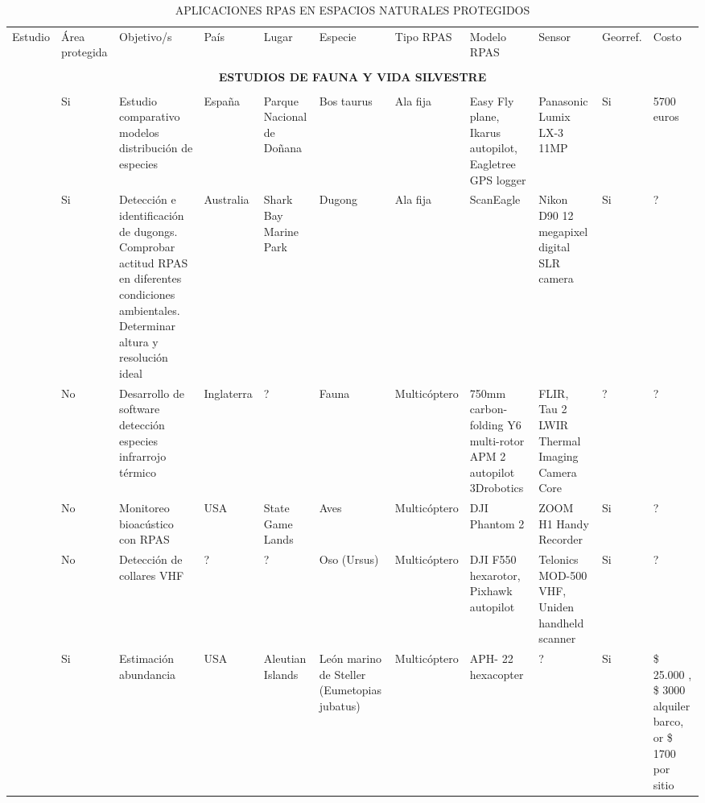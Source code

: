 \documentclass[onecolumn]{extarticle}
\begin{document}
\begin{landscape}
\begin{table}

\caption{APLICACIONES RPAS EN ESPACIOS NATURALES PROTEGIDOS}
\tiny
\begin{tabular}{p{3cm}p{1.2cm}p{3cm}p{1cm}p{2cm}p{2cm}p{1cm}p{2cm}p{2cm}p{1cm}p{2cm}}

\cmidrule(r){1-11}

Estudio & Área protegida & Objetivo/s & País & Lugar & Especie & Tipo RPAS & Modelo RPAS & Sensor & Georref. & Costo \\ \cmidrule(r){1-11}

\multicolumn{11}{c}{} \\
\multicolumn{11}{c}{ {\bf ESTUDIOS DE FAUNA Y VIDA SILVESTRE}  } \\
\multicolumn{11}{c}{} \\

\cite{PazmanyMulero2015}  & Si & Estudio comparativo modelos distribución de especies & España & Parque Nacional de Doñana & Bos taurus  & Ala fija & Easy Fly plane, Ikarus autopilot, Eagletree GPS logger & Panasonic Lumix LX-3 11MP & Si & 
5700 euros \\ 

\citealt{Hodgson2013} & Si & Detección e identificación de dugongs.  Comprobar actitud  RPAS en diferentes condiciones ambientales. Determinar altura y resolución ideal  & Australia & Shark Bay Marine Park & Dugong & Ala fija &  ScanEagle & Nikon D90 12 megapixel digital SLR camera  & Si & ?  \\ 

\cite{Longmore2017} & No & Desarrollo de software detección especies infrarrojo térmico & Inglaterra & ? & Fauna & Multicóptero & 750mm carbon-folding Y6 multi-rotor APM 2 autopilot 3Drobotics & FLIR, Tau 2 LWIR Thermal Imaging Camera Core  & ? & ?  \\ 

\cite{Wilson2017}  & No & Monitoreo bioacústico con RPAS & USA & State Game Lands & Aves  & Multicóptero & DJI Phantom 2 & ZOOM H1 Handy Recorder  & Si & ? \\ 

\cite{Bayram2016}  &  No & Detección de collares VHF & ? & ? & Oso (Ursus)  & Multicóptero & DJI F550 hexarotor, Pixhawk autopilot & Telonics MOD-500 VHF, Uniden handheld scanner  & Si & ? \\ 

\cite{Christie2016}  &  Si  & Estimación abundancia & USA &  Aleutian Islands & León marino de Steller (Eumetopias jubatus) & Multicóptero & APH- 22 hexacopter & ?  & Si & \$ 25.000 , \$ 3000 alquiler barco, or \$ 1700 por sitio \\ 


\end{tabular}
\end{table}
\end{landscape}
\end{document}

